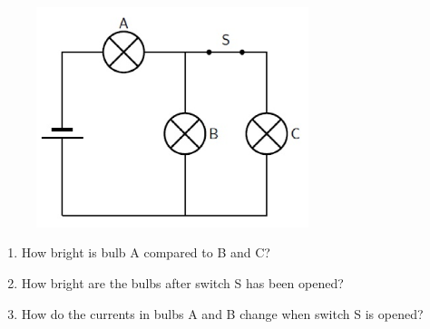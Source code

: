 \begin{enumerate}[noitemsep, label=\textbf{\arabic*}. ]
	\begin{figure}[H] %
    \begin{center}
    \label{m38776*id68542!!!underscore!!!media}\label{m38776*id68542!!!underscore!!!printimage}\includegraphics[width=300px]{col11305.imgs/m38776_PG10C9_037.png} %
        
      \vspace{2pt}
    \vspace{.1in}
    
    \end{center}

 \end{figure}   

    \addtocounter{footnote}{-0}
    \label{m38776*id68549}\begin{enumerate}[noitemsep, label=\textbf{\alph*}. ] 
            \label{m38776*uid101}\item How bright is bulb A compared to B and C?
\label{m38776*uid102}\item How bright are the bulbs after switch S has been opened?
\label{m38776*uid103}\item How do the currents in bulbs A and B change when switch S is opened?

    
      

\end{enumerate}
\end{enumerate}
